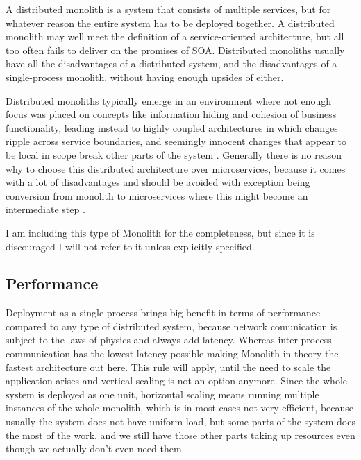 A distributed monolith is a system that consists of multiple services, but for whatever reason the entire system has to be deployed together. A distributed monolith may well meet the definition of a service-oriented architecture, but all too often fails to deliver on the promises of SOA. Distributed monoliths usually have all the disadvantages of a distributed system, and the disadvantages of a single-process monolith, without having enough upsides of either. \cite{MON_TO_MS_MONOLITH}

Distributed monoliths typically emerge in an environment where not enough focus was placed on concepts like information hiding and cohesion of business functionality, leading instead to highly coupled architectures in which changes ripple across service boundaries, and seemingly innocent changes that appear to be local in scope break other parts of the system \cite{MON_TO_MS_MONOLITH}. Generally there is no reason why to choose this distributed architecture over microservices, because it comes with a lot of disadvantages and should be avoided with exception being conversion from monolith to microservices where this might become an intermediate step \cite{DIST_MON_WHICH_BUILDING}.

I am including this type of Monolith for the completeness, but since it is discouraged I will not refer to it unless explicitly specified.





\subsection{Performance}
\label{section:monolith:performance}
Deployment as a single process brings big benefit in terms of performance compared to any type of distributed system, because network comunication is subject to the laws of physics and always add latency. Whereas inter process communication has the lowest latency possible making Monolith in theory the fastest architecture out here. This rule will apply, until the need to scale the application arises and vertical scaling is not an option anymore. Since the whole system is deployed as one unit, horizontal scaling means running multiple instances of the whole monolith, which is in most cases not very efficient, because usually the system does not have uniform load, but some parts of the system does the most of the work, and we still have those other parts taking up resources even though we actually don't even need them.


